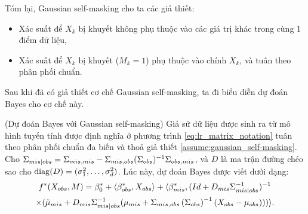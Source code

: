 Tóm lại, Gaussian self-masking cho ta các giả thiết:
\begin{itemize}
    \item Xác suất để $X_k$ bị khuyết không phụ thuộc vào các giá trị khác trong cùng 1 điểm dữ liệu,
    \item Xác suất để $X_k$ bị khuyết ($M_k = 1$) phụ thuộc vào chính $X_k$, và tuân theo phân phối chuẩn.
\end{itemize}

Sau khi đã có giả thiết cơ chế Gaussian self-masking, ta đi biểu diễn dự đoán Bayes cho cơ chế này.


\begin{prop}\label{prop:gaussian_bayes_predictor} (Dự đoán Bayes với Gaussian self-masking)
Giả sử dữ liệu được sinh ra từ mô hình tuyến tính được định nghĩa ở phương trình \eqref{eq:lr_matrix_notation} tuân theo phân phối chuẩn đa biến và thoả giả thiết  \ref{assume:gaussian_self-masking}. 
Cho $\Sigma_{mis|obs} = \Sigma_{mis,mis} - \Sigma_{mis,obs} (\Sigma_{obs})^{-1} \Sigma_{obs,mis}$,
và $D$ là ma trận đường chéo sao cho $\operatorname{diag}(D) = (\sigma_1^2, \dots, \sigma_d^2)$. Lúc này, dự đoán Bayes được viết dưới dạng:
\begin{multline}\label{eq:gaussian_bayes_predictor}
    f^{*}(X_{obs}, M) = 
    \beta_{0}^{*} + \langle\beta_{obs}^{*}, X_{obs}\rangle 
    + \langle\beta_{mis}^{*},(Id + D_{mis} \Sigma_{mis|obs}^{-1})^{-1} \\
    \times (\tilde{\mu}_{mis} + D_{mis}\Sigma_{mis|obs}^{-1}(\mu_{mis} + 
    \Sigma_{mis,obs}\left(\Sigma_{obs}\right)^{-1} (X_{obs}-\mu_{obs}))) \rangle.
\end{multline}
\end{prop}


